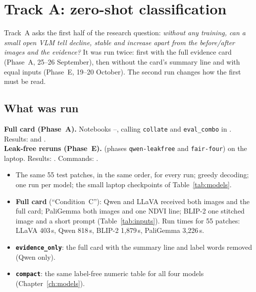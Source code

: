 \chapter{Track A: zero-shot classification}
\label{ch:trackA}

Track~A asks the first half of the research question: \emph{without any training, can a small open VLM tell decline, stable and increase apart from the before/after images and the evidence?} It was run twice: first with the full evidence card (Phase~A, 25--26 September), then without the card's summary line and with equal inputs (Phase~E, 19--20 October). The second run changes how the first must be read.

\section{What was run}

\begin{wherecode}
\textbf{Full card (Phase~A).} Notebooks --, calling \texttt{collate} and \texttt{eval\_combo} in . Results:  and .\\
\textbf{Leak-free reruns (Phase~E).}  (phases \texttt{qwen-leakfree} and \texttt{fair-four}) on the laptop. Results: . Commands: .
\end{wherecode}

\begin{itemize}
  \item The same 55 test patches, in the same order, for every run; greedy decoding; one run per model; the small laptop checkpoints of Table~\ref{tab:models}.
  \item \textbf{Full card} (``Condition~C''): Qwen and LLaVA received both images and the full card; PaliGemma both images and one NDVI line; BLIP-2 one stitched image and a short prompt (Table~\ref{tab:inputs}). Run times for 55 patches: LLaVA 403\,s, Qwen 818\,s, BLIP-2 1,879\,s, PaliGemma 3,226\,s.
  \item \textbf{\texttt{evidence\_only}}: the full card with the summary line and label words removed (Qwen only).
  \item \textbf{\texttt{compact}}: the same label-free numeric table for all four models (Chapter~\ref{ch:models}).
\end{itemize}

